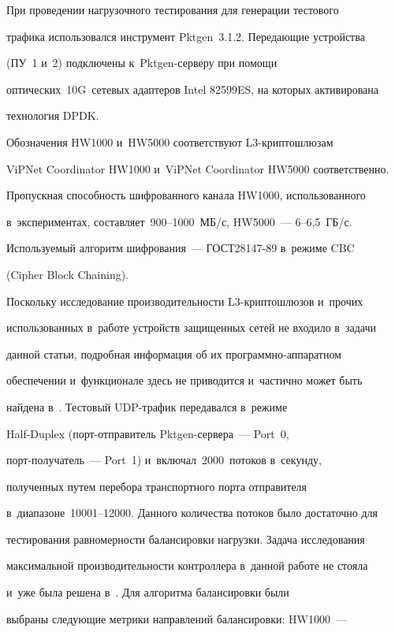   


  При проведении нагрузочного тестирования для генерации тестового 


трафика использовался инструмент Pktgen~3.1.2. Передающие устройства 


(ПУ~1 и~2) подключены к~Pktgen-сер\-ве\-ру при помощи 


оптических~10G~сетевых адаптеров Intel 82599ES, на которых активирована 


технология DPDK.


  


  Обозначения HW1000 и~HW5000 соответствуют L3-крип\-то\-шлю\-зам 


ViPNet Coordinator HW1000 и~ViPNet Coordinator HW5000 соответственно. 


Пропускная способность шифрованного канала HW1000, использованного 


в~экспериментах, составляет~900--1000~МБ\!/\!с, HW5000~--- 6--6,5~ГБ\!/\!с. 


Используемый алгоритм шифрования~--- ГОСТ28147-89 в~режиме CBC


(Cipher Block Chaining). 


Поскольку исследование производительности L3-крип\-то\-шлю\-зов и~прочих 


использованных в~работе устройств защищенных сетей не входило в~задачи 


данной статьи, подробная информация об их про\-грам\-мно-ап\-па\-рат\-ном 


обеспечении и~функционале здесь не приводится и~частично может быть 


найдена в~\cite{9-sdn}. Тестовый UDP-тра\-фик передавался в~режиме  


Half-Duplex (порт-от\-пра\-ви\-тель Pktgen-сер\-ве\-ра~--- Port~0,  


порт-по\-лу\-ча\-тель~--- Port~1) и~включал~2000~потоков в~секунду, 


полученных путем перебора транспортного порта отправителя 


в~диапазоне~10001--12000. Данного количества потоков было достаточно для 


тестирования равномерности балансировки нагрузки. Задача исследования 


максимальной производительности контроллера в~данной работе не стояла 


и~уже была решена в~\cite{8-sdn, 9-sdn}. Для алгоритма балансировки были 


выбраны следующие метрики направлений балансировки: HW1000~--- 


